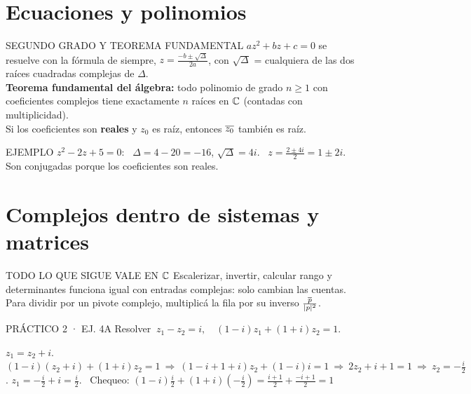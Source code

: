 \section{Ecuaciones y polinomios}
\begin{sello}{SEGUNDO GRADO Y TEOREMA FUNDAMENTAL}
$az^2+bz+c=0$ se resuelve con la fórmula de siempre, $z=\frac{-b\pm\sqrt{\Delta}}{2a}$, con $\sqrt\Delta$ = cualquiera de las dos raíces cuadradas complejas de $\Delta$.\\[2pt]
\textbf{Teorema fundamental del álgebra:} todo polinomio de grado $n\ge1$ con coeficientes complejos tiene exactamente $n$ raíces en $\mathbb{C}$ (contadas con multiplicidad).\\[2pt]
Si los coeficientes son \textbf{reales} y $z_0$ es raíz, entonces $\overline{z_0}$ también es raíz.
\end{sello}
\begin{memo}{EJEMPLO}
$z^2-2z+5=0$: \ $\Delta=4-20=-16$, $\sqrt\Delta=4i$. \ $z=\frac{2\pm4i}2=1\pm2i$. Son conjugadas porque los coeficientes son reales.
\end{memo}

\section{Complejos dentro de sistemas y matrices}
\begin{tip}{TODO LO QUE SIGUE VALE EN $\mathbb{C}$}
Escalerizar, invertir, calcular rango y determinantes funciona igual con entradas complejas: solo cambian las cuentas. Para dividir por un pivote complejo, multiplicá la fila por su inverso $\frac{\overline{p}}{|p|^2}$.
\end{tip}
\begin{enunciado}{PRÁCTICO 2 · EJ. 4A}
Resolver $\ z_1-z_2=i,\quad (1-i)z_1+(1+i)z_2=1$.
\end{enunciado}
$z_1=z_2+i$.
$(1-i)(z_2+i)+(1+i)z_2=1\ \Rightarrow\ (1-i+1+i)z_2+(1-i)i=1\ \Rightarrow\ 2z_2+i+1=1\ \Rightarrow\ z_2=-\tfrac i2$.
$z_1=-\tfrac i2+i=\tfrac i2$. \ Chequeo: $(1-i)\frac i2+(1+i)(-\frac i2)=\frac{i+1}2+\frac{-i+1}2=1$\ok
{}
